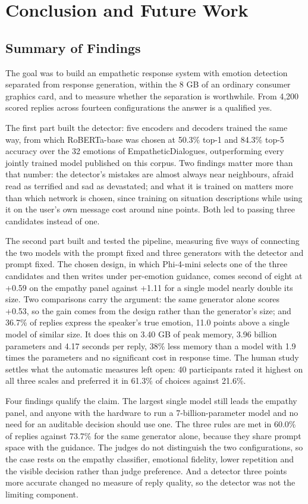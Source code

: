 \chapter{Conclusion and Future Work}
\label{ch:6}

\section{Summary of Findings}
\label{sec:6.1}

The goal was to build an empathetic response system with emotion detection separated from response generation, within the 8 GB of an ordinary consumer graphics card, and to measure whether the separation is worthwhile. From 4,200 scored replies across fourteen configurations the answer is a qualified yes.

The first part built the detector: five encoders and decoders trained the same way, from which RoBERTa-base was chosen at 50.3\% top-1 and 84.3\% top-5 accuracy over the 32 emotions of EmpatheticDialogues, outperforming every jointly trained model published on this corpus. Two findings matter more than that number: the detector's mistakes are almost always near neighbours, afraid read as terrified and sad as devastated; and what it is trained on matters more than which network is chosen, since training on situation descriptions while using it on the user's own message cost around nine points. Both led to passing three candidates instead of one.

The second part built and tested the pipeline, measuring five ways of connecting the two models with the prompt fixed and three generators with the detector and prompt fixed. The chosen design, in which Phi-4-mini selects one of the three candidates and then writes under per-emotion guidance, comes second of eight at +0.59 on the empathy panel against +1.11 for a single model nearly double its size. Two comparisons carry the argument: the same generator alone scores +0.53, so the gain comes from the design rather than the generator's size; and 36.7\% of replies express the speaker's true emotion, 11.0 points above a single model of similar size. It does this on 3.40 GB of peak memory, 3.96 billion parameters and 4.17 seconds per reply, 38\% less memory than a model with 1.9 times the parameters and no significant cost in response time. The human study settles what the automatic measures left open: 40 participants rated it highest on all three scales and preferred it in 61.3\% of choices against 21.6\%.

Four findings qualify the claim. The largest single model still leads the empathy panel, and anyone with the hardware to run a 7-billion-parameter model and no need for an auditable decision should use one. The three rules are met in 60.0\% of replies against 73.7\% for the same generator alone, because they share prompt space with the guidance. The judges do not distinguish the two configurations, so the case rests on the empathy classifier, emotional fidelity, lower repetition and the visible decision rather than judge preference. And a detector three points more accurate changed no measure of reply quality, so the detector was not the limiting component.

